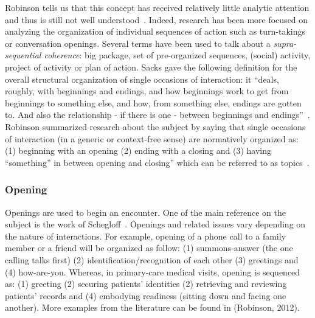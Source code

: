 \documentclass[a4paper,11pt,twoside]{StyleThese}
\begin{document}
Robinson tells us that this concept has received relatively little analytic attention and thus is still not well understood~\cite{robinson_overall_2012}. Indeed, research has been more focused on analyzing the organization of individual sequences of action such as turn-takings or conversation openings. Several terms have been used to talk about a \textit{supra-sequential coherence}: big package, set of pre-organized sequences, (social) activity, project of activity or plan of action. Sacks gave the following definition for the overall structural organization of single occasions of interaction: it ``deals, roughly, with beginnings and endings, and how beginnings work to get from beginnings to something else, and how, from something else, endings are gotten to. And also the relationship - if there is one - between beginnings and endings''~\cite[p.~157]{sacks_lectures_1995}. Robinson summarized research about the subject by saying that single occasions of interaction (in a generic or context-free sense) are normatively organized as: (1) beginning with an opening (2) ending with a closing and (3) having ``something'' in between opening and closing'' which can be referred to as topics~\cite{robinson_overall_2012}.

\subsubsection{Opening}
Openings are used to begin an encounter. One of the main reference on the subject is the work of Schegloff~\cite{schegloff_1986_routine}. Openings and related issues vary depending on the nature of interactions. For example, opening of a phone call to a family member or a friend will be organized as follow: (1) summons-answer (the one calling talks first) (2) identification/recognition of each other (3) greetings and (4) how-are-you. Whereas, in primary-care medical visits, opening is sequenced as: (1) greeting (2) securing patients’ identities (2) retrieving and reviewing patients’ records and (4) embodying readiness (sitting down and facing one another). More examples from the literature can be found in (Robinson, 2012). 
\end{document}
